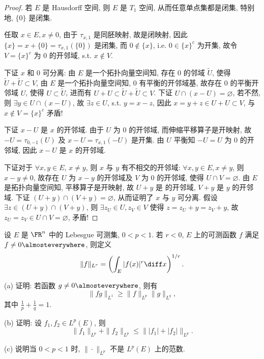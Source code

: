 \documentclass{mathexercise}
\begin{document}
\begin{proof}
    \necessary
    若 $E$ 是 Hausdorff 空间, 则 $E$ 是 $T_1$ 空间, 从而任意单点集都是闭集,
    特别地, $\{0\}$ 是闭集.

    \sufficient
    任取 $x \in E, x \neq 0$, 由于 $\tau_{x, 1}$ 是同胚映射, 故是闭映射, 
    因此 $\{x\}=x+\{0\}=\tau_{x, 1}(\{0\})$ 是闭集, 而 $0 \notin\{x\}$, 
    i.e. $0 \in\{x\}^{c}$ 为开集, 故令 $V=\{x\}^{c}$ 为 0 的开邻域, s.t. $x \notin V$.
    
    下证 $x$ 和 0 可分离:
    由 $E$ 是一个拓扑向量空间知, 存在 0 的邻域 $\tilde{U}$, 
    使得 $\tilde{U}+\tilde{U} \subset V$,
    由 $E$ 是一个拓扑向量空间知, 0 有平衡的开邻域基, 故存在 0 的平衡开邻域 $U$, 
    使得 $U \subset \tilde{U}$, 进而有 $U+U \subset \tilde{U}+\tilde{U} \subset V$.
    下证 $U \cap(x-U)=\varnothing$, 若不然, 则 $\exists y \in U \cap(x-U)$, 
    故 $\exists z \in U$, s.t. $y=x-z$, 因此 $x=y+z \in U+U \subset V$, 与 $x \notin V=\{x\}^{c}$ 矛盾!
    
    下证 $x-U$ 是 $x$ 的开邻域. 由于 $U$ 为 0 的开邻域, 而伸缩平移算子是开映射, 
    故 $-U=\tau_{0,-1}(U)$ 及 $x-U=\tau_{x, 1}(-U)$ 是开集. 由 $U$ 平衡知 $-U=U$ 为 0 的开邻域, 因此 $x-U$ 是 $x$ 的开邻域.

    下证对于 $\forall x,y\in E$, $x\neq y$, 则 $x$ 与 $y$ 有不相交的开邻域:
    $\forall x, y \in E, x \neq y$, 则 $x-y \neq 0$, 故存在 $U$ 为 $x-y$ 的开邻域及 $V$ 为 0 的开邻域, 
    使得 $U \cap V=\varnothing$.
    由 $E$ 是拓扑向量空间知, 平移算子是开映射, 故 $U+y$ 是 的开邻域, $V+y$ 是 $y$ 的开邻域.
    下证 $(U+y) \cap(V+y)=\varnothing$, 从而证明了 $x$ 与 $y$ 可分离. 
    假设 $\exists z \in(U+y) \cap(V+y)$, 则 $\exists z_{U} \in U, z_{V} \in V$
    使得 $z=z_{U}+y=z_{V}+y$, 故 $z_{U}=z_{V} \in U \cap V=\varnothing$, 矛盾!
\end{proof}



\begin{exercise}
    设 $E$ 是 $\FR^n$ 中的 Lebesgue 可测集, $0<p<1$.
    若 $r<0$, $E$ 上的可测函数 $f$ 满足 $f\neq 0\almosteverywhere$, 则定义
    \[\|f\|_{L^r}=\left(\int_E |f(x)|^r\diff x\right)^{1/r}.\]

    (a) 证明: 若函数 $g\neq 0\almosteverywhere$, 则有
    \[\|fg\|_{L^1}\geq \|f\|_{L^p}\|g\|_{L^q},\]
    其中 $\frac{1}{p}+\frac{1}{q}=1$.

    (b) 证明: 设 $f_1,f_2\in L^p(E)$, 则
    \[\|f_1\|_{L^p}+\|f_2\|_{L^p}\leq\bigl\| |f_1|+|f_2|\bigr\|_{L^p}.\]

    (c) 说明当 $0<p<1$ 时, $\|\cdot\|_{L^p}$ 不是 $L^p(E)$ 上的范数.
\end{exercise}
\end{document}
